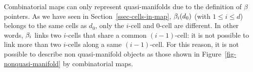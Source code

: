 Combinatorial maps can only represent quasi-manifolds due to the
definition of $\beta$ pointers. As we have seen in
Section~\ref{ssec-cells-in-map}, $\beta_{i}(d_0)$ (with $1\leq i \leq d$)
belongs to the same cells as $d_0$, only the $i$-cell and $0$-cell are
different. In other words, $\beta_{i}$ links two $i$-cells that
share a common $(i-1)$-cell: it is not possible to link more than two
$i$-cells along a same $(i-1)$-cell.
%
%
For this reason, it is not possible to describe non quasi-manifold
objects as those shown in Figure~\ref{fig-nonquasi-manifold} by
combinatorial maps.
%
